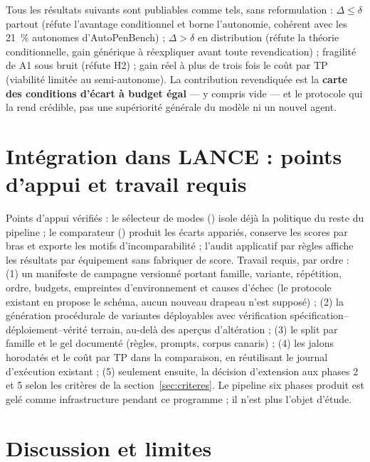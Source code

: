 \documentclass[11pt,a4paper]{article}
\newcommand{\code}[1]{{\small\ttfamily\path{#1}}}
\begin{document}
Tous les r\'esultats suivants sont publiables comme tels, sans reformulation : $\Delta \le \delta$ partout (r\'efute l'avantage conditionnel et borne l'autonomie, coh\'erent avec les 21~\% autonomes d'AutoPenBench) ; $\Delta > \delta$ en distribution (r\'efute la th\'eorie conditionnelle, gain g\'en\'erique \`a r\'eexpliquer avant toute revendication) ; fragilit\'e de A1 sous bruit (r\'efute H2) ; gain r\'eel \`a plus de trois fois le co\^ut par TP (viabilit\'e limit\'ee au semi-autonome). La contribution revendiqu\'ee est la \textbf{carte des conditions d'\'ecart \`a budget \'egal} --- y compris vide --- et le protocole qui la rend cr\'edible, pas une sup\'eriorit\'e g\'en\'erale du mod\`ele ni un nouvel agent.

\section{Int\'egration dans LANCE : points d'appui et travail requis}
\label{sec:integration}

Points d'appui v\'erifi\'es : le s\'electeur de modes (\code{run_modes.py}) isole d\'ej\`a la politique du reste du pipeline ; le comparateur (\code{compare_policies.py}) produit les \'ecarts appari\'es, conserve les scores par bras et exporte les motifs d'incomparabilit\'e ; l'audit applicatif par r\`egles affiche les r\'esultats par \'equipement sans fabriquer de score. Travail requis, par ordre : (1) un manifeste de campagne versionn\'e portant famille, variante, r\'ep\'etition, ordre, budgets, empreintes d'environnement et causes d'\'echec (le protocole existant en propose le sch\'ema, aucun nouveau drapeau n'est suppos\'e) ; (2) la g\'en\'eration proc\'edurale de variantes d\'eployables avec v\'erification sp\'ecification--d\'eploiement--v\'erit\'e terrain, au-del\`a des aper\c cus d'alt\'eration ; (3) le split par famille et le gel document\'e (r\`egles, prompts, corpus canaris) ; (4) les jalons horodat\'es et le co\^ut par TP dans la comparaison, en r\'eutilisant le journal d'ex\'ecution existant ; (5) seulement ensuite, la d\'ecision d'extension aux phases 2 et 5 selon les crit\`eres de la section~\ref{sec:criteres}. Le pipeline six phases \og produit \fg{} est gel\'e comme infrastructure pendant ce programme ; il n'est plus l'objet d'\'etude.

\section{Discussion et limites}
\label{sec:limites}
\end{document}
